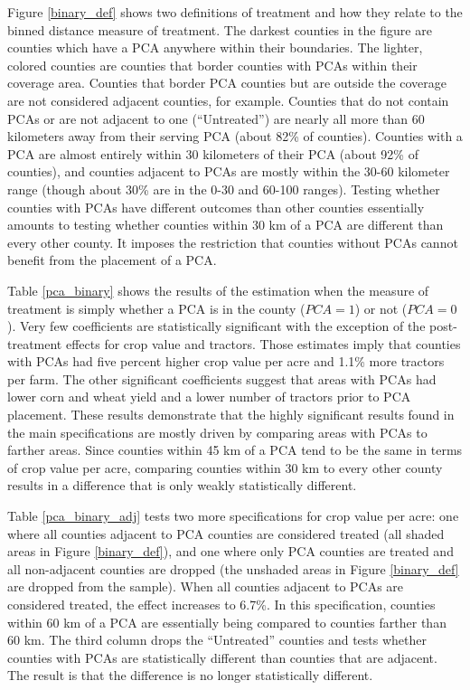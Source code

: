 \documentclass[12pt]{article}
\begin{document}
\begin{appendices}
Figure \ref{binary_def} shows two definitions of treatment and how they relate to the binned distance measure of treatment.
The darkest counties in the figure are counties which have a PCA anywhere within their boundaries.
The lighter, colored counties are counties that border counties with PCAs within their coverage area.
Counties that border PCA counties but are outside the coverage are not considered adjacent counties, for example.
Counties that do not contain PCAs or are not adjacent to one (``Untreated'') are nearly all more than 60 kilometers away from their serving PCA (about 82\% of counties).
Counties with a PCA are almost entirely within 30 kilometers of their PCA (about 92\% of counties), and counties adjacent to PCAs are mostly within the 30-60 kilometer range (though about 30\% are in the 0-30 and 60-100 ranges).
Testing whether counties with PCAs have different outcomes than other counties essentially amounts to testing whether counties within 30 km of a PCA are different than every other county.
It imposes the restriction that counties without PCAs cannot benefit from the placement of a PCA.

Table \ref{pca_binary} shows the results of the estimation when the measure of treatment is simply whether a PCA is in the county ($PCA =1 $) or not ($PCA=0$).
Very few coefficients are statistically significant with the exception of the post-treatment effects for crop value and tractors.
Those estimates imply that counties with PCAs had five percent higher crop value per acre and 1.1\% more tractors per farm.
The other significant coefficients suggest that areas with PCAs had lower corn and wheat yield and a lower number of tractors prior to PCA placement.
These results demonstrate that the highly significant results found in the main specifications are mostly driven by comparing areas with PCAs to farther areas.
Since counties within 45 km of a PCA tend to be the same in terms of crop value per acre, comparing counties within 30 km to every other county results in a difference that is only weakly statistically different.

Table \ref{pca_binary_adj} tests two more specifications for crop value per acre: one where all counties adjacent to PCA counties are considered treated (all shaded areas in Figure \ref{binary_def}), and one where only PCA counties are treated and all non-adjacent counties are dropped (the unshaded areas in Figure \ref{binary_def} are dropped from the sample).
When all counties adjacent to PCAs are considered treated, the effect increases to 6.7\%. 
In this specification, counties within 60 km of a PCA are essentially being compared to counties farther than 60 km.
The third column drops the ``Untreated'' counties and tests whether counties with PCAs are statistically different than counties that are adjacent.
The result is that the difference is no longer statistically different.


\end{appendices}
\end{document}
